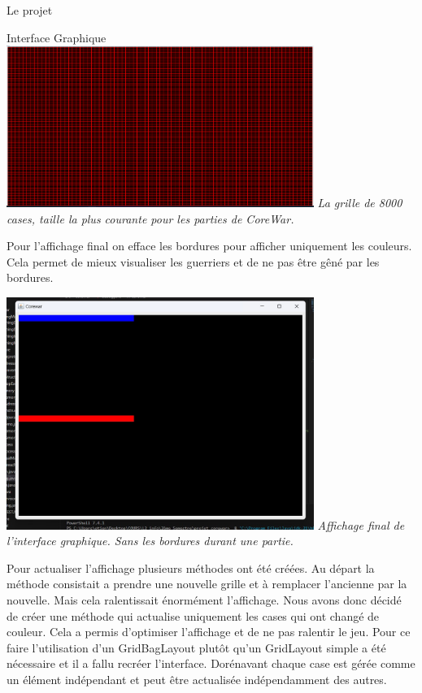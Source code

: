 \documentclass[a4paper, 10pt]{article}
\begin{document}
\begin{section}{Le projet}
\begin{subsection}{Interface Graphique}
                \includegraphics[width=10cm]{img/grille_interface.png}\newline
                \textit{La grille de 8000 cases, taille la plus courante pour les parties de CoreWar.}
                \bigskip

            \par
                Pour l'affichage final on efface les bordures pour afficher uniquement les couleurs. Cela permet de mieux visualiser les guerriers et de ne pas être gêné par les bordures.
                \bigskip

                \includegraphics[width=10cm]{img/display.jpg}\newline
                \textit{Affichage final de l'interface graphique. Sans les bordures durant une partie.}
                \bigskip
            
            \par
                Pour actualiser l'affichage plusieurs méthodes ont été créées. Au départ la méthode consistait a prendre une nouvelle grille et à remplacer l'ancienne par la nouvelle. Mais cela ralentissait énormément l'affichage. Nous avons donc décidé de créer une méthode qui actualise uniquement les cases qui ont changé de couleur. Cela a permis d'optimiser l'affichage et de ne pas ralentir le jeu.
                Pour ce faire l'utilisation d'un GridBagLayout plutôt qu'un GridLayout simple a été nécessaire et il a fallu recréer l'interface. Dorénavant chaque case est gérée comme un élément indépendant et peut être actualisée indépendamment des autres.
        \end{subsection}
    
    \end{section}
\end{document}
